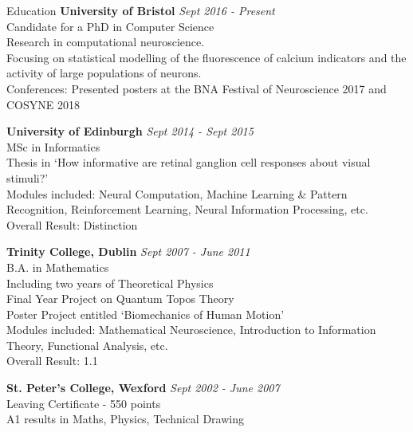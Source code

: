 \documentclass{resume} %
\begin{document}

\begin{rSection}{Education}
{\bf University of Bristol} \hfill {\em Sept 2016 - Present} \\
Candidate for a PhD in Computer Science \\
Research in computational neuroscience. \\
Focusing on statistical modelling of the fluorescence of calcium indicators and the activity of large populations of neurons. \\
Conferences: Presented posters at the BNA Festival of Neuroscience 2017 and COSYNE 2018

{\bf University of Edinburgh} \hfill {\em Sept 2014 - Sept 2015} \\
MSc in Informatics \\
Thesis in `How informative are retinal ganglion cell responses about visual stimuli?' \\
Modules included: Neural Computation, Machine Learning \& Pattern Recognition, Reinforcement Learning, Neural Information Processing, etc.  \smallskip \\
Overall Result: Distinction

{\bf Trinity College, Dublin} \hfill {\em Sept 2007 - June 2011} \\
B.A. in Mathematics \\
Including two years of Theoretical Physics \\
Final Year Project on Quantum Topos Theory \\
Poster Project entitled `Biomechanics of Human Motion' \\
Modules included: Mathematical Neuroscience, Introduction to Information Theory, Functional Analysis, etc. \smallskip \\
Overall Result: 1.1


{\bf St. Peter's College, Wexford} \hfill {\em Sept 2002 - June 2007} \\
Leaving Certificate - 550 points \\
A1 results in Maths, Physics, Technical Drawing
\end{rSection}

\end{document}
